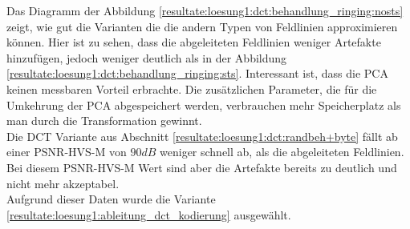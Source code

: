 Das Diagramm der Abbildung  \ref{resultate:loesung1:dct:behandlung_ringing:nosts} zeigt, wie gut die Varianten die die andern Typen von Feldlinien approximieren können. Hier ist zu sehen, dass die abgeleiteten Feldlinien weniger Artefakte hinzufügen, jedoch weniger deutlich als in der Abbildung \ref{resultate:loesung1:dct:behandlung_ringing:sts}. Interessant ist, dass die PCA keinen messbaren Vorteil erbrachte. Die zusätzlichen Parameter, die für die Umkehrung der PCA abgespeichert werden, verbrauchen mehr Speicherplatz als man durch die Transformation gewinnt.\\
Die DCT Variante aus Abschnitt \ref{resultate:loesung1:dct:randbeh+byte} fällt ab einer PSNR-HVS-M von $90 dB$ weniger schnell ab, als die abgeleiteten Feldlinien. Bei diesem PSNR-HVS-M Wert sind aber die Artefakte bereits zu deutlich und nicht mehr akzeptabel.\\

Aufgrund dieser Daten wurde die Variante \ref{resultate:loesung1:ableitung_dct_kodierung} ausgewählt. 
